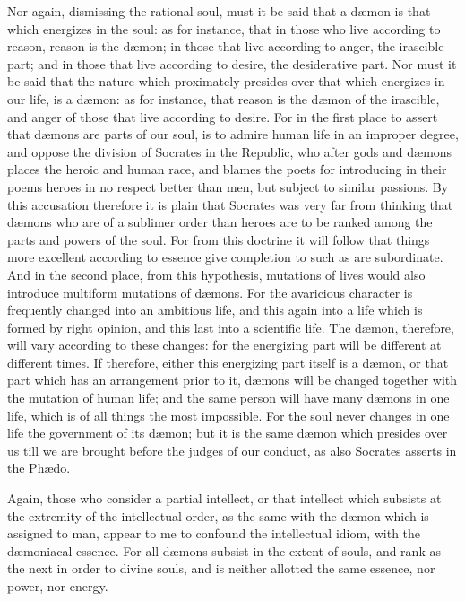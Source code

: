 \documentclass[12pt]{article}
\begin{document}
Nor again, dismissing the rational soul, must it be said that a d{\ae}mon is
that which energizes in the soul: as for instance, that in those who live
according to reason, reason is the d{\ae}mon; in those that live according to
anger, the irascible part; and in those that live according to desire, the
desiderative part. Nor must it be said that the nature which proximately
presides over that which energizes in our life, is a d{\ae}mon: as for
instance, that reason is the d{\ae}mon of the irascible, and anger of those
that live according to desire. For in the first place to assert that d{\ae}mons
are parts of our soul, is to admire human life in an improper degree, and
oppose the division of Socrates in the Republic, who after gods and d{\ae}mons
places the heroic and human race, and blames the poets for introducing in their
poems heroes in no respect better than men, but subject to similar passions. By
this accusation therefore it is plain that Socrates was very far from thinking
that d{\ae}mons who are of a sublimer order than heroes are to be ranked among
the parts and powers of the soul. For from this doctrine it will follow that
things more excellent according to essence give completion to such as are
subordinate. And in the second place, from this hypothesis, mutations of lives
would also introduce multiform mutations of d{\ae}mons. For the avaricious
character is frequently changed into an ambitious life, and this again into a
life which is formed by right opinion, and this last into a scientific life.
The d{\ae}mon, therefore, will vary according to these changes: for the
energizing part will be different at different times. If therefore, either this
energizing part itself is a d{\ae}mon, or that part which has an arrangement
prior to it, d{\ae}mons will be changed together with the mutation of human
life; and the same person will have many d{\ae}mons in one life, which is of
all things the most impossible. For the soul never changes in one life the
government of its d{\ae}mon; but it is the same d{\ae}mon which presides over
us till we are brought before the judges of our conduct, as also Socrates
asserts in the Ph{\ae}do.

Again, those who consider a partial intellect, or that intellect which subsists
at the extremity of the intellectual order, as the same with the d{\ae}mon
which is assigned to man, appear to me to confound the intellectual idiom, with
the d{\ae}moniacal essence. For all d{\ae}mons subsist in the extent of souls,
and rank as the next in order to divine souls, and is neither allotted the same
essence, nor power, nor energy.
\end{document}
